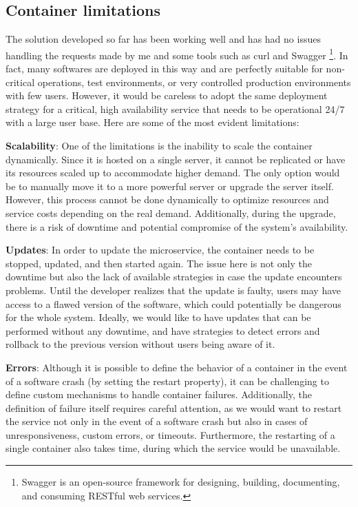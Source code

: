\documentclass[manuscript,screen,review]{acmart}
\begin{document}
\subsection{Container limitations}
The solution developed so far has been working well and has had no issues handling the requests made by me and some tools such as curl and Swagger \footnote{Swagger is an open-source framework for designing, building, documenting, and consuming RESTful web services.}. In fact, many softwares are deployed in this way and are perfectly suitable for non-critical operations, test environments, or very controlled production environments with few users. However, it would be careless to adopt the same deployment strategy for a critical, high availability service that needs to be operational 24/7 with a large user base. Here are some of the most evident limitations:

\textbf{Scalability}: One of the limitations is the inability to scale the container dynamically. Since it is hosted on a single server, it cannot be replicated or have its resources scaled up to accommodate higher demand. The only option would be to manually move it to a more powerful server or upgrade the server itself. However, this process cannot be done dynamically to optimize resources and service costs depending on the real demand. Additionally, during the upgrade, there is a risk of downtime and potential compromise of the system’s availability.

\textbf{Updates}: In order to update the microservice, the container needs to be stopped, updated, and then started again. The issue here is not only the downtime but also the lack of available strategies in case the update encounters problems. Until the developer realizes that the update is faulty, users may have access to a flawed version of the software, which could potentially be dangerous for the whole system. Ideally, we would like to have updates that can be performed without any downtime, and have strategies to detect errors and rollback to the previous version without users being aware of it.

\textbf{Errors}: Although it is possible to define the behavior of a container in the event of a software crash (by setting the restart property), it can be challenging to define custom mechanisms to handle container failures. Additionally, the definition of failure itself requires careful attention, as we would want to restart the service not only in the event of a software crash but also in cases of unresponsiveness, custom errors, or timeouts. Furthermore, the restarting of a single container also takes time, during which the service would be unavailable.
\end{document}
